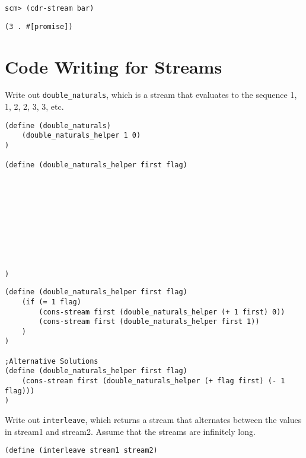 \documentclass{exam}
\begin{document}
\begin{questions}
\begin{blocksection}
\begin{lstlisting}
scm> (cdr-stream bar)
\end{lstlisting}
\begin{solution}[.35in]
\begin{lstlisting}
(3 . #[promise])
\end{lstlisting}
\end{solution}

\end{blocksection}

\section{Code Writing for Streams}

\begin{blocksection}
\question Write out \texttt{double\_naturals}, which is a stream that evaluates to the sequence 1, 1, 2, 2, 3, 3, etc.
\begin{lstlisting}
(define (double_naturals)
    (double_naturals_helper 1 0)
)

(define (double_naturals_helper first flag)










)

\end{lstlisting}

\begin{solution}
\begin{lstlisting}
(define (double_naturals_helper first flag)
    (if (= 1 flag)
        (cons-stream first (double_naturals_helper (+ 1 first) 0))
        (cons-stream first (double_naturals_helper first 1))
    )
)

;Alternative Solutions
(define (double_naturals_helper first flag)
    (cons-stream first (double_naturals_helper (+ flag first) (- 1 flag)))
)
\end{lstlisting}
\end{solution}
\end{blocksection}

\begin{blocksection}
\question Write out \texttt{interleave}, which returns a stream that alternates between the values in stream1 and stream2. Assume that the streams are infinitely long.
\begin{lstlisting}
(define (interleave stream1 stream2)














\end{lstlisting}
\end{blocksection}
\end{questions}
\end{document}
